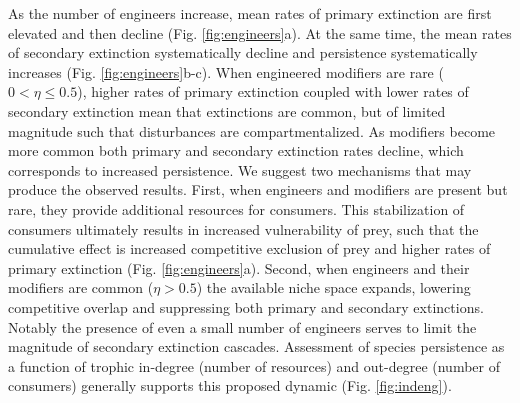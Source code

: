 \documentclass[twocolumn,preprintnumbers,amsmath,amssymb,superscriptaddress,linenumbers]{revtex4-1}
\begin{document}
As the number of engineers increase, mean rates of primary extinction are first elevated and then decline (Fig. \ref{fig:engineers}a).
At the same time, the mean rates of secondary extinction systematically decline and persistence systematically increases (Fig. \ref{fig:engineers}b-c).
When engineered modifiers are rare ($0 < \eta \leq 0.5$), higher rates of primary extinction coupled with lower rates of secondary extinction mean that extinctions are common, but of limited magnitude such that disturbances are compartmentalized.
As modifiers become more common both primary and secondary extinction rates decline, which corresponds to increased persistence.
We suggest two mechanisms that may produce the observed results.
First, when engineers and modifiers are present but rare, they provide additional resources for consumers.
This stabilization of consumers ultimately results in increased vulnerability of prey, such that the cumulative effect is increased competitive exclusion of prey and higher rates of primary extinction (Fig. \ref{fig:engineers}a).
Second, when engineers and their modifiers are common ($\eta > 0.5$) the available niche space expands, lowering competitive overlap and suppressing both primary and secondary extinctions.
Notably the presence of even a small number of engineers serves to limit the magnitude of secondary extinction cascades.
Assessment of species persistence as a function of trophic in-degree (number of resources) and out-degree (number of consumers) generally supports this proposed dynamic (Fig. \ref{fig:indeng}).

\end{document}

